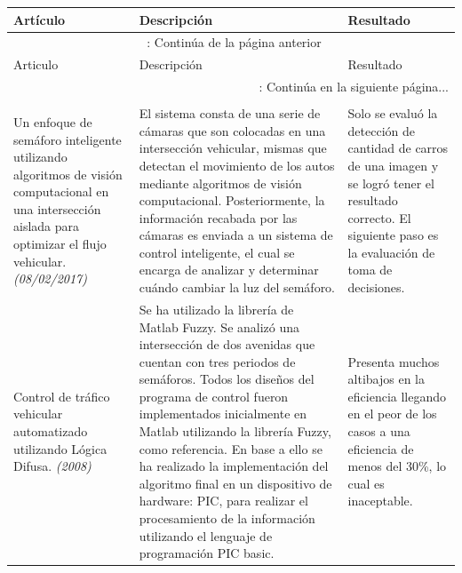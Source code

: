 \begin{center}
	\begin{longtable}{|p{3.0cm}|p{7.4cm}|p{5.0cm}|}
		

		
		\hline Artículo & Descripción & Resultado \\ \hline
		\endfirsthead
		
		\multicolumn{3}{c}{{\tablename\ \thetable{}: Continúa de la página anterior}}\\

		\hline Articulo & Descripción & Resultado \\ \hline
		\endhead
		
		\hline \multicolumn{3}{|r|}{{\tablename\ \thetable{}: Continúa en la siguiente página...}}\\ \hline
		\endfoot
		
		\hline \multicolumn{3}{|r|}{{ \tablename\ \thetable{}: Estado del arte }}\\ \hline

		\endlastfoot
		

		
		Un enfoque de semáforo inteligente utilizando algoritmos de visión computacional en una intersección aislada para optimizar el flujo vehicular.\cite{garciag} \newline \emph{(08/02/2017)} &
		El sistema consta de una serie de cámaras que son colocadas en una intersección vehicular, mismas que detectan el movimiento de los autos mediante algoritmos de visión computacional.
		Posteriormente, la información recabada por las cámaras es enviada a un sistema de control inteligente, el cual se encarga de analizar y determinar cuándo cambiar la luz del semáforo.&
		Solo se evaluó la detección de cantidad de carros de una imagen y se logró tener el resultado correcto. El siguiente paso es la evaluación de toma de decisiones.\\ \hline
		
		
		Control de tráfico vehicular automatizado utilizando Lógica Difusa.\cite{alvaroer} \newline \emph{(2008)} &
		Se ha utilizado la librería de Matlab Fuzzy. Se analizó una intersección de dos avenidas que cuentan con tres periodos de semáforos.  Todos los diseños del programa de control fueron implementados inicialmente en Matlab utilizando la librería Fuzzy, como referencia. En base a ello se ha realizado la implementación del algoritmo final en un dispositivo de hardware: PIC, para realizar el procesamiento de la información utilizando el lenguaje de programación PIC basic.&
		Presenta muchos altibajos en la eficiencia llegando en el peor de los casos a una eficiencia de menos del 30\%, lo cual es inaceptable.\\ \hline
		

\end{longtable}
\end{center}
